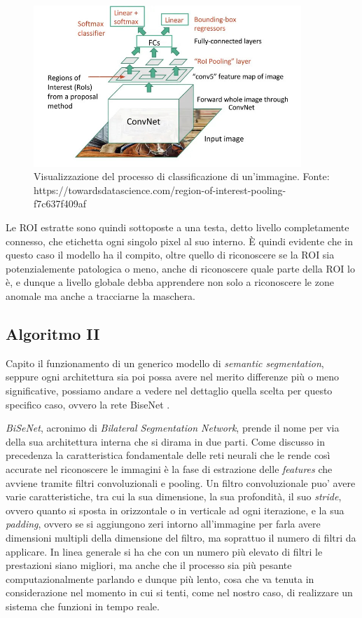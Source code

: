 \begin{figure}[ht]
    \centering
    \includegraphics[width=0.9\textwidth]{./assets/cnn.jpg}
    \caption{\label{fig:cnn}Visualizzazione del processo di classificazione di un'immagine. Fonte: https://towardsdatascience.com/region-of-interest-pooling-f7c637f409af}
\end{figure}

Le ROI estratte sono quindi sottoposte a una testa, detto livello
completamente connesso, che etichetta ogni singolo pixel al suo
interno.
È quindi evidente che in questo caso il modello ha il compito,
oltre quello di riconoscere se la ROI sia potenzialemente patologica
o meno, anche di riconoscere quale parte della ROI lo è, e dunque
a livello globale debba apprendere non solo a riconoscere le zone
anomale ma anche a tracciarne la maschera.

\subsection{\label{sec:bisenet}Algoritmo II}

Capito il funzionamento di un generico modello di
{\it semantic segmentation}, seppure ogni architettura sia poi
possa avere nel merito differenze più o meno significative,
possiamo andare a vedere nel dettaglio quella scelta per 
questo specifico caso, ovvero la rete BiseNet \cite{bisenet}.

{\it BiSeNet}\cite{bisenet}, acronimo di
{\it Bilateral Segmentation Network}, prende il nome per via
della sua architettura interna che si dirama in due parti.
Come discusso in precedenza la caratteristica fondamentale
delle reti neurali che le rende così accurate nel riconoscere
le immagini è la fase di estrazione delle {\it features} che avviene
tramite filtri convoluzionali e pooling.
Un filtro convoluzionale puo' avere varie caratteristiche,
tra cui la sua dimensione, la sua profondità, il suo {\it stride},
ovvero quanto si sposta in orizzontale o in verticale ad ogni
iterazione, e la sua {\it padding}, ovvero se si aggiungono
zeri intorno all'immagine per farla avere dimensioni multipli
della dimensione del filtro, ma soprattuo il numero di filtri da
applicare.
In linea generale si ha che con un numero più elevato di filtri
le prestazioni siano migliori, ma anche che il processo
sia più pesante computazionalmente parlando e dunque più
lento, cosa che va tenuta in considerazione nel momento in cui 
si tenti, come nel nostro caso, di realizzare un sistema che funzioni
in tempo reale.


